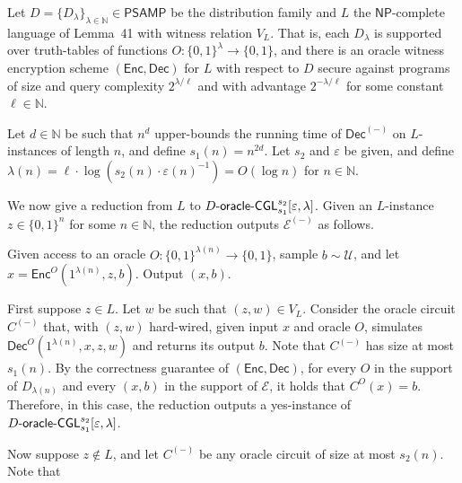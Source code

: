 Let $D=\{D_{\lambda}\}_{\lambda\in\mathbb{N}}\in{\mathsf{P}}{\mathsf{SAMP}}$ be the distribution family and $L$ the ${\mathsf{NP}}$-complete language of Lemma 41 with witness relation $V_{L}$. That is, each $D_{\lambda}$ is supported over truth-tables of functions $O:\{0,1\}^{\lambda}\to\{0,1\}$, and there is an oracle witness encryption scheme $({\mathsf{Enc}},{\mathsf{Dec}})$ for $L$ with respect to $D$ secure against programs of size and query complexity $2^{\lambda/\ell}$ and with advantage $2^{-\lambda/\ell}$ for some constant $\ell\in\mathbb{N}$.\par




Let $d\in\mathbb{N}$ be such that $n^{d}$ upper-bounds the running time of ${\mathsf{Dec}}^{(-)}$ on $L$-instances of length $n$, and define $s_{1}(n)=n^{2d}$. Let $s_{2}$ and $\varepsilon$ be given, and define $\lambda(n)=\ell\cdot\log(s_{2}(n)\cdot\varepsilon(n)^{-1})=O(\log n)$ for $n\in\mathbb{N}$.\par




We now give a reduction from $L$ to $D\text{-}{\sf oracle}\text{-}{\sf CGL}^{s_{2}}_{s_{1}}[\varepsilon,\lambda]$. Given an $L$-instance $z\in\{0,1\}^{n}$ for some $n\in\mathbb{N}$, the reduction outputs $\mathcal{E}^{(-)}$ as follows.\par



Given access to an oracle $O:\{0,1\}^{\lambda(n)}\to\{0,1\}$, sample $b\sim\mathcal{U}$, and let $x={\mathsf{Enc}}^{O}(1^{\lambda(n)},z,b)$. Output $(x,b)$.\par





First suppose $z\in L$. Let $w$ be such that $(z,w)\in V_{L}$. Consider the oracle circuit $C^{(-)}$ that, with $(z,w)$ hard-wired, given input $x$ and oracle $O$, simulates ${\mathsf{Dec}}^{O}(1^{\lambda(n)},x,z,w)$ and returns its output $b$. Note that $C^{(-)}$ has size at most $s_{1}(n)$. By the correctness guarantee of $({\mathsf{Enc}},{\mathsf{Dec}})$, for every $O$ in the support of $D_{\lambda(n)}$ and every $(x,b)$ in the support of $\mathcal{E}$, it holds that $C^{O}(x)=b$. Therefore, in this case, the reduction outputs a yes-instance of $D\text{-}{\sf oracle}\text{-}{\sf CGL}^{s_{2}}_{s_{1}}[\varepsilon,\lambda]$.\par




Now suppose $z\notin L$, and let $C^{(-)}$ be any oracle circuit of size at most $s_{2}(n)$. Note that\par


